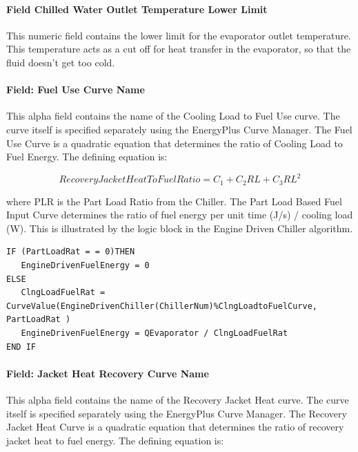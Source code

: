 \paragraph{Field Chilled Water Outlet Temperature Lower Limit}\label{field-chilled-water-outlet-temperature-lower-limit-3}

This numeric field contains the lower limit for the evaporator outlet temperature. This temperature acts as a cut off for heat transfer in the evaporator, so that the fluid doesn't get too cold.

\paragraph{Field: Fuel Use Curve Name}\label{field-fuel-use-curve-name}

This alpha field contains the name of the Cooling Load to Fuel Use curve. The curve itself is specified separately using the EnergyPlus Curve Manager. The Fuel Use Curve is a quadratic equation that determines the ratio of Cooling Load to Fuel Energy. The defining equation is:

\begin{equation}
RecoveryJacketHeatToFuelRatio = {C_1} + {C_2}RL + {C_3}R{L^2}
\end{equation}

where PLR is the Part Load Ratio from the Chiller. The Part Load Based Fuel Input Curve determines the ratio of fuel energy per unit time (J/s) / cooling load (W). This is illustrated by the logic block in the Engine Driven Chiller algorithm.

\begin{lstlisting}
IF (PartLoadRat = = 0)THEN
   EngineDrivenFuelEnergy = 0
ELSE
   ClngLoadFuelRat = CurveValue(EngineDrivenChiller(ChillerNum)%ClngLoadtoFuelCurve, PartLoadRat )
   EngineDrivenFuelEnergy = QEvaporator / ClngLoadFuelRat
END IF
\end{lstlisting}

\paragraph{Field: Jacket Heat Recovery Curve Name}\label{field-jacket-heat-recovery-curve-name-000}

This alpha field contains the name of the Recovery Jacket Heat curve. The curve itself is specified separately using the EnergyPlus Curve Manager. The Recovery Jacket Heat Curve is a quadratic equation that determines the ratio of recovery jacket heat to fuel energy. The defining equation is:

